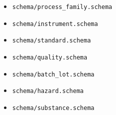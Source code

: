 \documentclass[9pt,a4paper,openany]{book}
\begin{document}
\begin{itemize}
\item \texttt{schema/\allowbreak{}process\_\allowbreak{}family.\allowbreak{}schema}
\end{itemize}


\begin{itemize}
\item \texttt{schema/\allowbreak{}instrument.\allowbreak{}schema}
\end{itemize}


\begin{itemize}
\item \texttt{schema/\allowbreak{}standard.\allowbreak{}schema}
\end{itemize}


\begin{itemize}
\item \texttt{schema/\allowbreak{}quality.\allowbreak{}schema}
\end{itemize}


\begin{itemize}
\item \texttt{schema/\allowbreak{}batch\_\allowbreak{}lot.\allowbreak{}schema}
\end{itemize}


\begin{itemize}
\item \texttt{schema/\allowbreak{}hazard.\allowbreak{}schema}
\end{itemize}


\begin{itemize}
\item \texttt{schema/\allowbreak{}substance.\allowbreak{}schema}
\end{itemize}
\end{document}
